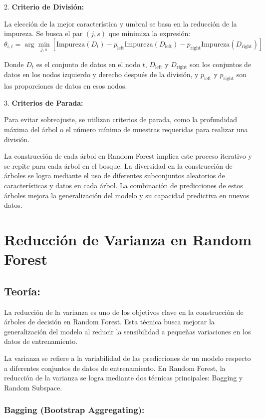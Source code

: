\documentclass[12pt]{article}
\begin{document}
2. \textbf{Criterio de División:}

La elección de la mejor característica y umbral se basa en la reducción de la impureza. Se busca el par \((j, s)\) que minimiza la expresión:
\[ \theta_{i,t} = \arg\min_{j, s} \left[ \textrm{Impureza}(D_t) - p_{\textrm{left}}\textrm{Impureza}(D_{\textrm{left}}) - p_{\textrm{right}}\textrm{Impureza}(D_{\textrm{right}}) \right] \]

Donde \(D_t\) es el conjunto de datos en el nodo \(t\), \(D_{\textrm{left}}\) y \(D_{\textrm{right}}\) son los conjuntos de datos en los nodos izquierdo y derecho después de la división, y \(p_{\textrm{left}}\) y \(p_{\textrm{right}}\) son las proporciones de datos en esos nodos.

3. \textbf{Criterios de Parada:}

Para evitar sobreajuste, se utilizan criterios de parada, como la profundidad máxima del árbol o el número mínimo de muestras requeridas para realizar una división.

La construcción de cada árbol en Random Forest implica este proceso iterativo y se repite para cada árbol en el bosque. La diversidad en la construcción de árboles se logra mediante el uso de diferentes subconjuntos aleatorios de características y datos en cada árbol. La combinación de predicciones de estos árboles mejora la generalización del modelo y su capacidad predictiva en nuevos datos.



\section{Reducción de Varianza en Random Forest}

\subsection{Teoría:}

La reducción de la varianza es uno de los objetivos clave en la construcción de árboles de decisión en Random Forest. Esta técnica busca mejorar la generalización del modelo al reducir la sensibilidad a pequeñas variaciones en los datos de entrenamiento.

La varianza se refiere a la variabilidad de las predicciones de un modelo respecto a diferentes conjuntos de datos de entrenamiento. En Random Forest, la reducción de la varianza se logra mediante dos técnicas principales: Bagging y Random Subspace.

\subsubsection{Bagging (Bootstrap Aggregating):}
\end{document}
